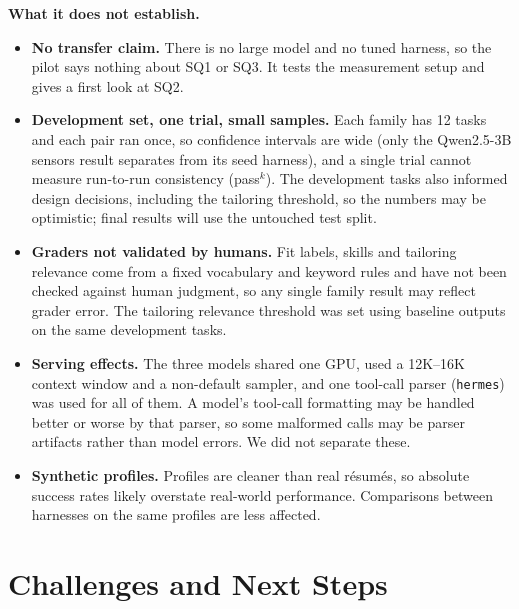 \documentclass[11pt]{article}
\begin{document}
\textbf{What it does not establish.}
\begin{itemize}
  \item \textbf{No transfer claim.} There is no large model and no tuned harness, so the pilot says nothing about SQ1 or SQ3. It tests the measurement setup and gives a first look at SQ2.
  \item \textbf{Development set, one trial, small samples.} Each family has 12 tasks and each pair ran once, so confidence intervals are wide (only the Qwen2.5-3B sensors result separates from its seed harness), and a single trial cannot measure run-to-run consistency (pass$^k$). The development tasks also informed design decisions, including the tailoring threshold, so the numbers may be optimistic; final results will use the untouched test split.
  \item \textbf{Graders not validated by humans.} Fit labels, skills and tailoring relevance come from a fixed vocabulary and keyword rules and have not been checked against human judgment, so any single family result may reflect grader error. The tailoring relevance threshold was set using baseline outputs on the same development tasks.
  \item \textbf{Serving effects.} The three models shared one GPU, used a 12K--16K context window and a non-default sampler, and one tool-call parser (\texttt{hermes}) was used for all of them. A model's tool-call formatting may be handled better or worse by that parser, so some malformed calls may be parser artifacts rather than model errors. We did not separate these.
  \item \textbf{Synthetic profiles.} Profiles are cleaner than real r\'esum\'es, so absolute success rates likely overstate real-world performance. Comparisons between harnesses on the same profiles are less affected.
\end{itemize}

\section{Challenges and Next Steps}
\end{document}
